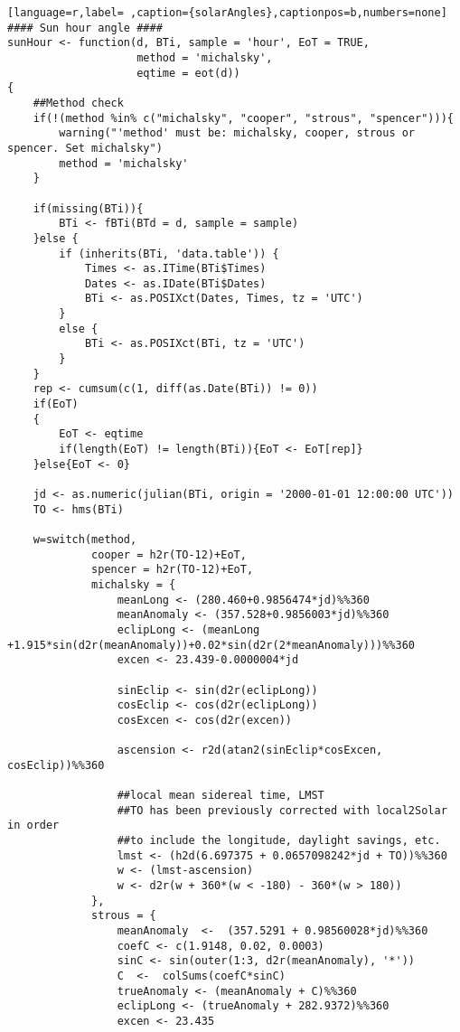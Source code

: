 \begin{lstlisting}[language=r,label= ,caption={solarAngles},captionpos=b,numbers=none]
#### Sun hour angle ####
sunHour <- function(d, BTi, sample = 'hour', EoT = TRUE,
                    method = 'michalsky',
                    eqtime = eot(d))
{
    ##Method check
    if(!(method %in% c("michalsky", "cooper", "strous", "spencer"))){
        warning("'method' must be: michalsky, cooper, strous or spencer. Set michalsky")
        method = 'michalsky'
    }

    if(missing(BTi)){
        BTi <- fBTi(BTd = d, sample = sample)
    }else {
        if (inherits(BTi, 'data.table')) {
            Times <- as.ITime(BTi$Times)
            Dates <- as.IDate(BTi$Dates)
            BTi <- as.POSIXct(Dates, Times, tz = 'UTC')
        }
        else {
            BTi <- as.POSIXct(BTi, tz = 'UTC')
        }   
    }
    rep <- cumsum(c(1, diff(as.Date(BTi)) != 0))
    if(EoT)
    {
        EoT <- eqtime
        if(length(EoT) != length(BTi)){EoT <- EoT[rep]}
    }else{EoT <- 0}

    jd <- as.numeric(julian(BTi, origin = '2000-01-01 12:00:00 UTC'))
    TO <- hms(BTi)

    w=switch(method,
             cooper = h2r(TO-12)+EoT,
             spencer = h2r(TO-12)+EoT,
             michalsky = {
                 meanLong <- (280.460+0.9856474*jd)%%360
                 meanAnomaly <- (357.528+0.9856003*jd)%%360
                 eclipLong <- (meanLong +1.915*sin(d2r(meanAnomaly))+0.02*sin(d2r(2*meanAnomaly)))%%360
                 excen <- 23.439-0.0000004*jd

                 sinEclip <- sin(d2r(eclipLong))
                 cosEclip <- cos(d2r(eclipLong))
                 cosExcen <- cos(d2r(excen))

                 ascension <- r2d(atan2(sinEclip*cosExcen, cosEclip))%%360

                 ##local mean sidereal time, LMST
                 ##TO has been previously corrected with local2Solar in order
                 ##to include the longitude, daylight savings, etc.
                 lmst <- (h2d(6.697375 + 0.0657098242*jd + TO))%%360
                 w <- (lmst-ascension)
                 w <- d2r(w + 360*(w < -180) - 360*(w > 180))
             },
             strous = {
                 meanAnomaly  <-  (357.5291 + 0.98560028*jd)%%360
                 coefC <- c(1.9148, 0.02, 0.0003)
                 sinC <- sin(outer(1:3, d2r(meanAnomaly), '*'))
                 C  <-  colSums(coefC*sinC)
                 trueAnomaly <- (meanAnomaly + C)%%360
                 eclipLong <- (trueAnomaly + 282.9372)%%360
                 excen <- 23.435


\end{lstlisting}
